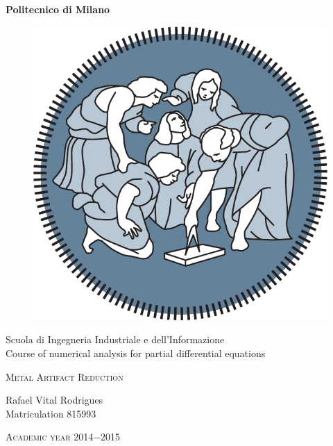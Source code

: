 \begin{center}
\large \textbf{Politecnico di Milano}
\end{center}
%
\begin{figure}[h]
\begin{center}
\includegraphics[scale=0.18]{img/logo_poli.png}
\end{center}
\end{figure}
%
\begin{center}
	\large Scuola di Ingegneria Industriale e dell'Informazione \\
  \vspace{6pt} Course of numerical analysis for partial differential equations  \\
\end{center}
%
\vspace{60pt}
\begin{center}
\LARGE \textsc{ Metal Artifact Reduction}
\end{center}
\vspace{60pt}
\begin{flushleft}
\end{flushleft}
\vspace{10pt}
\begin{flushright}
\large Rafael Vital Rodrigues \\ \vspace{6pt}  Matriculation
 815993 
\end{flushright}
\vfill
\begin{center}
\large \textsc{Academic year 2014$-$2015}
\end{center}
